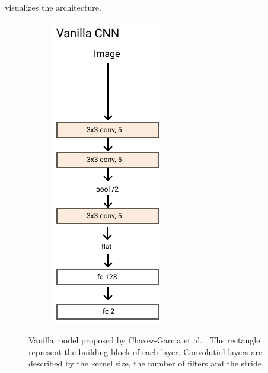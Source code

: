 \documentclass[../document.tex]{subfiles}
\begin{document}
 visualizes the architecture. 

\begin{figure}[htbp]
    \centering
    \begin{subfigure}[b]{0.25\linewidth}
        \includegraphics[width=\linewidth]{../img/3/models/transparent-omar.png}
    \end{subfigure}
    \caption{Vanilla model proposed by Chavez-Garcia et al. \cite{omar2018traversability}. The rectangle represent the building block of each layer. Convolutiol layers are described by the kernel size, the number of filters and the stride.}
    \label{fig : omar}
\end{figure}
\end{document}
